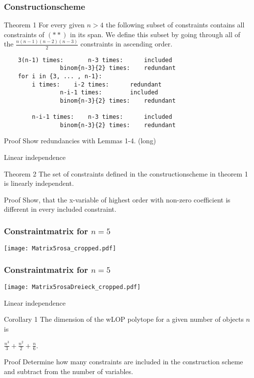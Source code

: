 \documentclass[xcolor=dvipsnames]{beamer}
\numberwithin{bsp}{section}
\numberwithin{figure}{section}
\begin{document}
\begin{frame}[fragile] 
	\frametitle{Constructionscheme}
	\begin{block}{Theorem 1}
		For every given $n>4$ the following subset of constraints contains all constraints of $(**)$ in its span. We define this subset by going through all of the $\frac{n(n-1)(n-2)(n-3)}{2}$ constraints in ascending order.
		\scriptsize
	\begin{lstlisting}
	3(n-1) times: 		n-3 times:		included
				binom{n-3}{2} times:	redundant
	for i in {3, ... , n-1}:
		i times:	i-2 times:		redundant
				n-i-1 times:		included
				binom{n-3}{2} times:	redundant
	
		n-i-1 times: 	n-3 times:		included
				binom{n-3}{2} times:	redundant
	\end{lstlisting}
	\end{block}
	\begin{block}{Proof}
		Show redundancies with Lemmas 1-4. (long)
	\end{block}
\end{frame}

\begin{frame}{Linear independence}
	\begin{block}{Theorem 2}
		The set of constraints defined in the constructionscheme in theorem 1 is linearly independent.
	\end{block}
	
	\begin{block}{Proof}
		Show, that the x-variable of highest order with non-zero coefficient is different in every included constraint.
	\end{block}
\end{frame}

\begin{frame}
	\frametitle{Constraintmatrix for $n=5$}
	\begin{center}
		\texttt{[image: Matrix5rosa\_cropped.pdf]}
	\end{center} 
\end{frame}

\begin{frame}
	\frametitle{Constraintmatrix for $n=5$}
	\begin{center}
		\texttt{[image: Matrix5rosaDreieck\_cropped.pdf]}
	\end{center} 
\end{frame}

\begin{frame}{Linear independence}
	\begin{block}{Corollary 1}
		The dimension of the wLOP polytope for a given number of objects $n$ is 
		\vspace{-5 pt}
		\begin{center}
			$\frac{n^3}{3}+ \frac{n^2}{2} + \frac{n}{6}$.
		\end{center}
	\end{block}
	
	\begin{block}{Proof}
		Determine how many constraints are included in the construction scheme and subtract from the number of variables.
	\end{block}
\end{frame}
\end{document}
